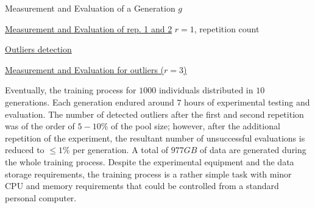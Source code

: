 \begin{algorithm}[h!]
\caption{Measurement and Evaluation of a Generation $g$}\label{alg:rep}

\underline{Measurement and Evaluation of rep. 1 and 2}\;
$r = 1$, repetition count\;

\underline{Outliers detection}\;

\underline{Measurement and Evaluation for outliers ($r=3$)}\;
\end{algorithm}

Eventually, the training process for $1000$ individuals distributed in $10$ generations. Each generation endured around $7$ hours of experimental testing and evaluation. The number of detected outliers after the first and second repetition was of the order of $5-10\%$ of the pool size; however, after the additional repetition of the experiment, the resultant number of unsuccessful evaluations is reduced to $\leq1\%$ per generation. A total of $977GB$ of data are generated during the whole training process. Despite the experimental equipment and the data storage requirements, the training process is a rather simple task with minor CPU and memory requirements that could be controlled from a standard personal computer.

